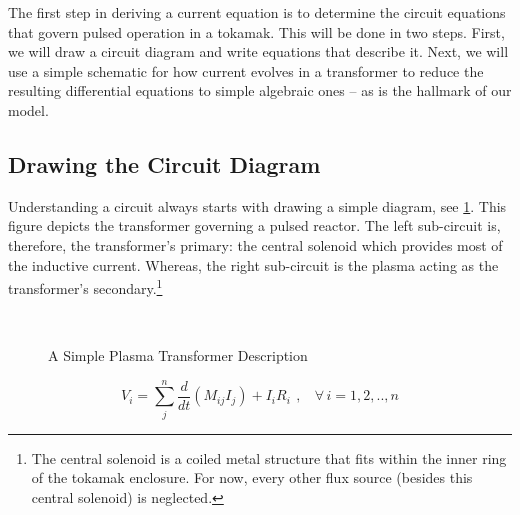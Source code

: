 The first step in deriving a current equation is to determine the circuit equations that govern pulsed operation in a tokamak. This will be done in two steps. First, we will draw a circuit diagram and write equations that describe it. Next, we will use a simple schematic for how current evolves in a transformer to reduce the resulting differential equations to simple algebraic ones -- as is the hallmark of our model.

\subsection{Drawing the Circuit Diagram}

Understanding a circuit always starts with drawing a simple diagram, see \cref{fig:circuit_diagram}. This figure depicts the transformer governing a pulsed reactor. The left sub-circuit is, therefore, the transformer's primary: the central solenoid which provides most of the inductive current. Whereas, the right sub-circuit is the plasma acting as the transformer's secondary.\footnote{The central solenoid is a coiled metal structure that fits within the inner ring of the tokamak enclosure. For now, every other flux source (besides this central solenoid) is neglected.}

\begin{figure}
\centering

\caption{A Simple Plasma Transformer Description} ~\\
\label{fig:circuit_diagram}
\end{figure}

\begin{equation}
	V_i = \sum_j^n \frac{d}{dt} \left( M_{ij} I_j \right) + I_i R_i \ \, , \ \ \ \ \forall \, i = 1,2,..,n
\end{equation}

